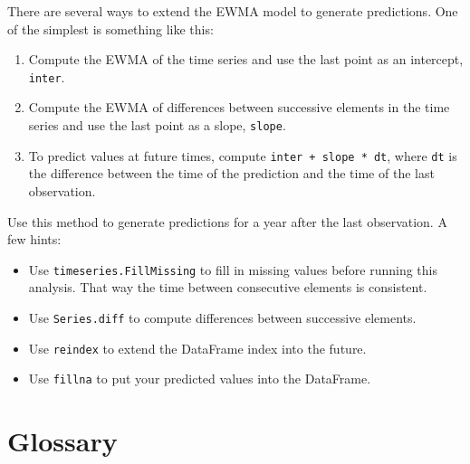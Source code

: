 \documentclass[12pt]{book}
\begin{document}
\begin{exercise}
There are several ways to extend the EWMA model to generate predictions.
One of the simplest is something like this:

\begin{enumerate}

\item Compute the EWMA of the time series and use the last point
as an intercept, {\tt inter}.

\item Compute the EWMA of differences between successive elements in
the time series and use the last point as a slope, {\tt slope}.

\item To predict values at future times, compute {\tt inter + slope * dt},
where {\tt dt} is the difference between the time of the prediction and
the time of the last observation.

\end{enumerate}

Use this method to generate predictions for a year after the last
observation.  A few hints:

\begin{itemize}

\item Use {\tt timeseries.FillMissing} to fill in missing values
before running this analysis.  That way the time between consecutive
elements is consistent.

\item Use {\tt Series.diff} to compute differences between successive
elements.

\item Use {\tt reindex} to extend the DataFrame index into the future.

\item Use {\tt fillna} to put your predicted values into the DataFrame.

\end{itemize}

\end{exercise}


\section{Glossary}
\end{document}
